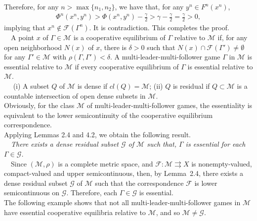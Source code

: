 Therefore, for any $n>\max\{n_1,n_2\}$, we have that, for any
$y^n\in F^n(x^n)$,
\begin{eqnarray*}
\Phi^n(x^n,y^n)>\Phi(x^n,y^n)-\frac{\gamma}{2}>\gamma-\frac{\gamma}{2}=\frac{\gamma}{2}>0,
\end{eqnarray*}
implying that $x^n\not\in \mathcal{F}(\Gamma^n)$.
It is contradiction.
This completes the proof.
\\

~~A point $x$
of $\Gamma\in \mathcal{M}$ is a cooperative equilibrium of
$\Gamma$ relative to $\mathcal{M}$
if, for any open neighborhood $N(x)$ of $x$, there is $\delta>0$ such that $N(x)\cap
\mathcal{F}(\Gamma')\neq\emptyset$ for any $\Gamma'\in \mathcal{M}$ with
$\rho(\Gamma,\Gamma')<\delta$.
A multi-leader-multi-follower game $\Gamma$ in $\mathcal{M}$ is
essential relative to $\mathcal{M}$ if every cooperative equilibrium
of $\Gamma$ is essential relative to $\mathcal{M}$.
\\

~~
(i) A subset $Q$ of $\mathcal{M}$ is dense if
$cl(Q)=\mathcal{M}$; (ii) $Q$ is residual if $Q\subset \mathcal{M}$ is
a countable intersection of open dense subsets in $\mathcal{M}$.
\\

Obviously, for the class $\mathcal{M}$ of multi-leader-multi-follower games,
the essentiality is equivalent to the
lower semicontinuity of the cooperative equilibrium correspondence.
\\

Applying Lemmas 2.4 and 4.2, we obtain the following result.
\\

~~{\it There exists a dense residual
subset $\mathcal{G}$ of $\mathcal{M}$ such that, $\Gamma$
is essential for each $\Gamma\in \mathcal{G}$.}
\\

~~Since $(\mathcal{M},\rho)$ is
a complete metric space, and
$\mathcal{F}:\mathcal{M}\rightrightarrows X$ is nonempty-valued,
 compact-valued and upper semicontinuous, then, by Lemma~2.4, there exists
a dense residual subset $\mathcal{G}$ of $\mathcal{M}$ such that the
correspondence $\mathcal{F}$ is lower semicontinuous on $\mathcal{G}$. Therefore,
each $\Gamma\in \mathcal{G}$ is essential.
\\

The following example shows that not all  multi-leader-multi-follower games in $\mathcal{M}$
have essential cooperative equilibria relative to $\mathcal{M}$,
and so $\mathcal{M}\neq \mathcal{G}$.
\\

